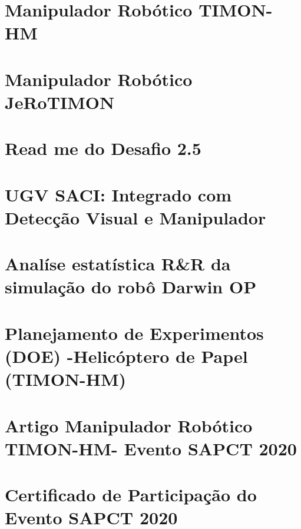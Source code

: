 \documentclass[fancyheadings, fancychapter, sureport]{Classes/a-prj}
\begin{document}
    \begin{thesisappendices}
        \chapter{Manipulador Robótico TIMON-HM}
        \label{append:timon}
        
        \chapter{Manipulador Robótico JeRoTIMON}
        \label{append:jerotimon}
        
        \chapter{Read me do Desafio 2.5}
        \label{append:readme_darwinop}
        

        \chapter{UGV SACI: Integrado com Detecção Visual e Manipulador}
        \label{append:saci}
        
        \chapter{Analíse estatística R\&R da simulação do robô Darwin OP}
        \label{append:darwinop}
        
        \chapter{Planejamento de Experimentos (DOE) -Helicóptero de Papel (TIMON-HM)}
        \label{append:doe}
        
        \chapter{Artigo Manipulador Robótico TIMON-HM- Evento SAPCT 2020}
        \label{append:sapct}
        
        \chapter{Certificado de Participação do Evento SAPCT 2020}
        \label{append:certificado_sapct}
        

\end{thesisappendices}
\end{document}
